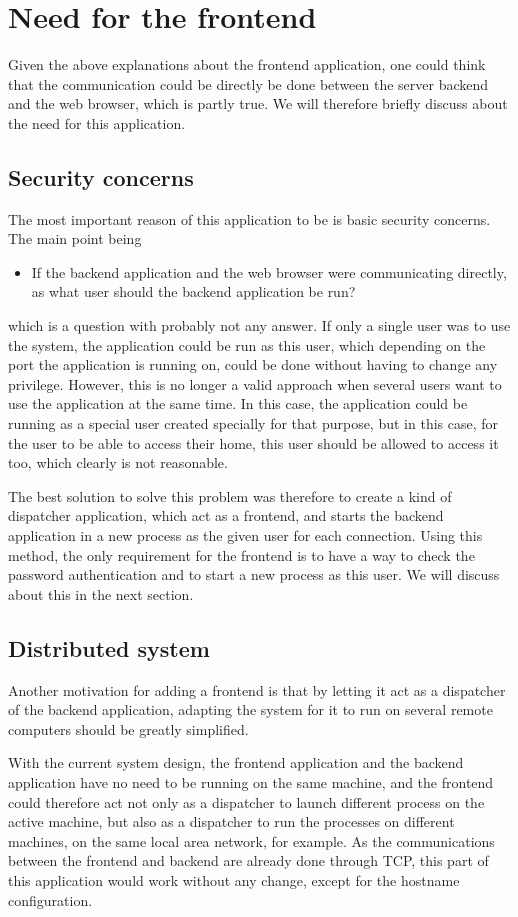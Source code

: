 \section{Need for the frontend}
Given the above explanations about the frontend application, one could 
think that the communication could be directly be done between the 
server backend and the web browser, which is partly true. We will therefore
briefly discuss about the need for this application.
%
\subsection{Security concerns}
The most important reason of this application to be is basic security concerns. 
The main point being
\begin{itemize}
\item If the backend application and the web browser were communicating directly, 
  as what user should the backend application be run?   
\end{itemize}
which is a question with probably not any answer. If only a single user was to 
use the system, the application could be run as this user, which depending on the 
port the application is running on, could be done without having to change any privilege.
However, this is no longer a valid approach when several users want to use the application 
at the same time. In this case, the application could be running as a special user 
created specially for that purpose, but in this case, for the user to be able to access 
their home, this user should be allowed to access it too, which clearly is not reasonable.

The best solution to solve this problem was therefore to create a kind of dispatcher application, 
which act as a frontend, and starts the backend application in a new process as the given user 
for each connection. Using this method, the only requirement for the frontend is to have a
way to check the password authentication and to start a new process as this user. We will 
discuss about this in the next section.
%
\subsection{Distributed system}
Another motivation for adding a frontend is that by letting it act as a dispatcher 
of the backend application, adapting the system for it to run on several remote computers
should be greatly simplified. 

With the current system design, the frontend application and the backend application have no need 
to be running on the same machine, and the frontend could therefore act not only as a dispatcher 
to launch different process on the active machine, but also as a dispatcher to run the processes 
on different machines, on the same local area network, for example. As the communications 
between the frontend and backend are already done through TCP, this part of this 
application would work without any change, except for the hostname configuration.


